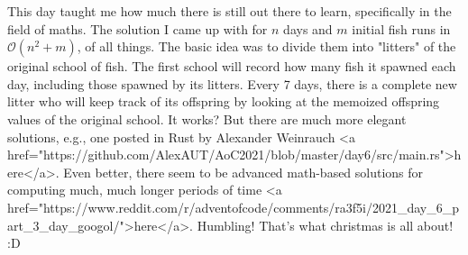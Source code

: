This day taught me how much there is still out there to learn, specifically in the field of maths. The solution I came up with for $n$ days and $m$ initial fish runs in $\mathcal{O}(n^2 + m)$, of all things. The basic idea was to divide them into "litters" of the original school of fish. The first school will record how many fish it spawned each day, including those spawned by its litters. Every 7 days, there is a complete new litter who will keep track of its offspring by looking at the memoized offspring values of the original school. It works? But there are much more elegant solutions, e.g., one posted in Rust by Alexander Weinrauch <a href="https://github.com/AlexAUT/AoC2021/blob/master/day6/src/main.rs">here</a>. Even better, there seem to be advanced math-based solutions for computing much, much longer periods of time <a href="https://www.reddit.com/r/adventofcode/comments/ra3f5i/2021_day_6_part_3_day_googol/">here</a>. Humbling! That's what christmas is all about! :D